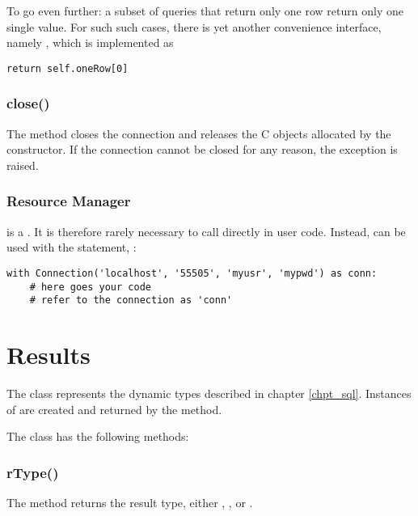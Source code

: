 To go even further: a subset of queries that return only
one row return only one single value. For such such cases,
there is yet another convenience interface, namely ,
which is implemented as

\begin{python}
\begin{lstlisting}
return self.oneRow[0]
\end{lstlisting}
\end{python}

\subsubsection{close()}
The method closes the connection and
releases the C objects allocated by
the constructor. If the connection
cannot be closed for any reason,
the exception  is raised.

\subsubsection{Resource Manager}
 is a .
It is therefore rarely necessary to call
 directly in user code.
Instead,  can
be used with the  statement, \ie:

\begin{python}
\begin{lstlisting}
with Connection('localhost', '55505', 'myusr', 'mypwd') as conn:
    # here goes your code
    # refer to the connection as 'conn'
\end{lstlisting}
\end{python}

\section{Results}
The  class represents
the dynamic types described in chapter \ref{chpt_sql}.
Instances of  are
created and returned by
the  method.

The  class has the following methods:

\subsubsection{rType()}
The method returns the result type,
either , ,
 or .

